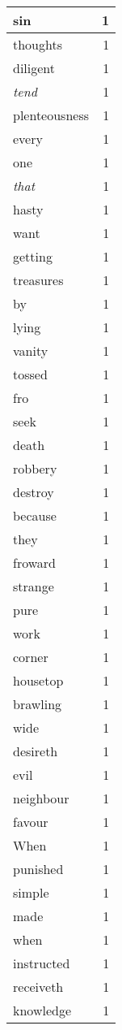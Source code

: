 \begin{center}
\begin{longtable}{l|r}
sin & 1\\ \hline 
thoughts & 1\\ \hline 
diligent & 1\\ \hline 
\emph{tend} & 1\\ \hline 
plenteousness & 1\\ \hline 
every & 1\\ \hline 
one & 1\\ \hline 
\emph{that} & 1\\ \hline 
hasty & 1\\ \hline 
want & 1\\ \hline 
getting & 1\\ \hline 
treasures & 1\\ \hline 
by & 1\\ \hline 
lying & 1\\ \hline 
vanity & 1\\ \hline 
tossed & 1\\ \hline 
fro & 1\\ \hline 
seek & 1\\ \hline 
death & 1\\ \hline 
robbery & 1\\ \hline 
destroy & 1\\ \hline 
because & 1\\ \hline 
they & 1\\ \hline 
froward & 1\\ \hline 
strange & 1\\ \hline 
pure & 1\\ \hline 
work & 1\\ \hline 
corner & 1\\ \hline 
housetop & 1\\ \hline 
brawling & 1\\ \hline 
wide & 1\\ \hline 
desireth & 1\\ \hline 
evil & 1\\ \hline 
neighbour & 1\\ \hline 
favour & 1\\ \hline 
When & 1\\ \hline 
punished & 1\\ \hline 
simple & 1\\ \hline 
made & 1\\ \hline 
when & 1\\ \hline 
instructed & 1\\ \hline 
receiveth & 1\\ \hline 
knowledge & 1\\ \hline 

\end{longtable}
\end{center}
